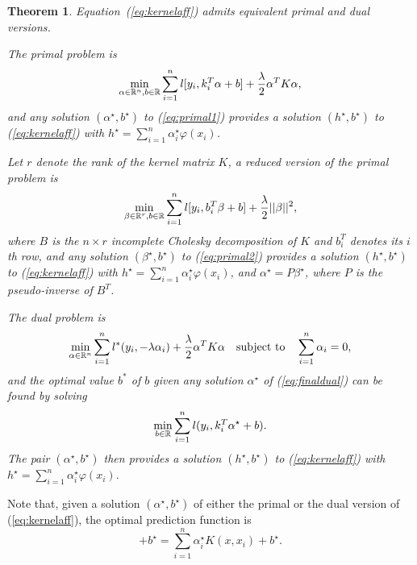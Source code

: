 \documentclass[12pt,letterpaper]{article}
\newtheorem{theorem}{Theorem}
\begin{document}
\begin{theorem}\label{th:affinelearn}
Equation~(\ref{eq:kernelaff}) admits equivalent primal and dual versions. 

The primal problem is
\begin{equation}
\min_{\alpha\in\mathbb{R}^n,b\in\mathbb{R}} \sum_{i=1}^n l[y_i,k_i^T\alpha+b]
+\frac{\lambda}{2}\alpha^TK\alpha,
\label{eq:primal1}
\end{equation}
and any solution $(\alpha^\star,b^\star)$ to (\ref{eq:primal1})
provides
a solution $(h^\star,b^\star)$ to (\ref{eq:kernelaff}) with
$h^\star=\sum_{i=1}^n \alpha_i^\star\varphi(x_i)$.

Let $r$ denote the rank of the kernel matrix $K$, a 
{\em reduced} version of the primal problem is 
\begin{equation}
\min_{\beta\in\mathbb{R}^r,b\in\mathbb{R}}  \sum_{i=1}^n l[y_i,b_i^T\beta+b]
+\frac{\lambda}{2}||\beta||^2,
\label{eq:primal2}
\end{equation}
where $B$ is the $n\times r$ incomplete Cholesky decomposition of $K$ and $b_i^T$ denotes
its $i$th row,
and any solution $(\beta^\star,b^\star)$ to (\ref{eq:primal2})
provides
a solution $(h^\star,b^\star)$ to (\ref{eq:kernelaff}) with
$h^\star=\sum_{i=1}^n \alpha_i^\star\varphi(x_i)$, and
$\alpha^\star=P\beta^\star$, where $P$ is the pseudo-inverse of $B^T$.

The dual problem is
\begin{equation}
\min_{\alpha\in\mathbb{R}^n}
\sum_{i=1}^n l^*(y_i,-\lambda\alpha_i) 
+\frac{\lambda}{2}\alpha^TK\alpha
\quad\text{subject to}\quad \sum_{i=1}^n \alpha_i=0,
\label{eq:finaldual}
\end{equation}
and the optimal value $b^*$ of $b$ given any solution
$\alpha^\star$ of (\ref{eq:finaldual}) can be found by solving
\begin{equation}
\min_{b\in \mathbb{R}} \sum_{i=1}^n l(y_i,k_i^T\alpha^{\star}+b).
\label{eq:minb}
\end{equation}
The pair $(\alpha^\star,b^\star)$ then provides a solution
$(h^\star,b^\star)$ to (\ref{eq:kernelaff}) with $h^\star=
\sum_{i=1}^n\alpha_i^\star\varphi(x_i)$.
\end{theorem}

Note that, given a solution $(\alpha^\star,b^\star)$ of either the
primal or the dual version of (\ref{eq:kernelaff}), the optimal
prediction function is
\begin{equation}
[h^\star|\varphi(x)]+b^\star= \sum_{i=1}^n \alpha_i^{\star} K(x,x_i) +b^\star.
\end{equation}
\end{document}
